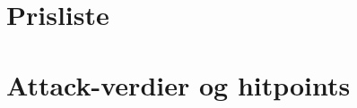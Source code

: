 \appendix
{}
\section{Prisliste} \label{prisliste}

\section{Attack-verdier og hitpoints} \label{hitpoints}
